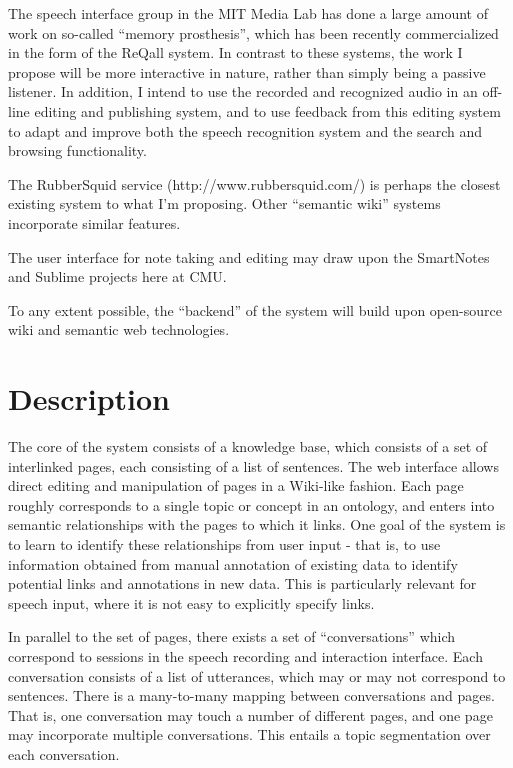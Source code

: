 \documentclass{article}
\begin{document}
The speech interface group in the MIT Media Lab has done a large
amount of work on so-called ``memory prosthesis'', which has been
recently commercialized in the form of the ReQall system.  In contrast
to these systems, the work I propose will be more interactive in
nature, rather than simply being a passive listener.  In addition, I
intend to use the recorded and recognized audio in an off-line editing
and publishing system, and to use feedback from this editing system to
adapt and improve both the speech recognition system and the search
and browsing functionality.

The RubberSquid service (http://www.rubbersquid.com/) is perhaps the
closest existing system to what I'm proposing.  Other ``semantic
wiki'' systems incorporate similar features.

The user interface for note taking and editing may draw upon the
SmartNotes and Sublime projects here at CMU.

To any extent possible, the ``backend'' of the system will build upon
open-source wiki and semantic web technologies.

\section{Description}
\label{sec:description}

The core of the system consists of a knowledge base, which consists of
a set of interlinked pages, each consisting of a list of sentences.
The web interface allows direct editing and manipulation of pages in a
Wiki-like fashion.  Each page roughly corresponds to a single topic or
concept in an ontology, and enters into semantic relationships with
the pages to which it links.  One goal of the system is to learn to
identify these relationships from user input - that is, to use
information obtained from manual annotation of existing data to
identify potential links and annotations in new data.  This is
particularly relevant for speech input, where it is not easy to
explicitly specify links.

In parallel to the set of pages, there exists a set of
``conversations'' which correspond to sessions in the speech recording
and interaction interface.  Each conversation consists of a list of
utterances, which may or may not correspond to sentences.  There is a
many-to-many mapping between conversations and pages.  That is, one
conversation may touch a number of different pages, and one page may
incorporate multiple conversations.  This entails a topic segmentation
over each conversation.
\end{document}
